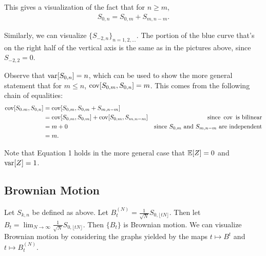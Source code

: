 \documentclass[../../../Master/AppliedStochastics.tex]{subfiles}
\begin{document}
This gives a visualization of the fact that for $n\geq m$, 
$$\begin{aligned}
    S_{0,n}=S_{0,m}+S_{m,n-m}.
\end{aligned}$$

Similarly, we can visualize $\{S_{-2,n}\}_{n=1,2,\dots}$.  
The portion of the blue curve that's on the right half of the vertical axis is the same as in the pictures above, since $S_{-2,2}=0$.

\begin{center}
\end{center}

Observe that $\operatorname{var}[S_{0,n}]=n$, which can be used to show the more general statement that for $m\leq n$, $\operatorname{cov}[S_{0,m},S_{0,n}]=m$.  
This comes from the following chain of equalities:
$$\begin{aligned}
\operatorname{cov}[S_{0.m},S_{0,n}]&=\operatorname{cov}[S_{0,m},S_{0,m}+S_{m,n-m}]\\
    &=\operatorname{cov}[S_{0,m},S_{0,m}]+\operatorname{cov}[S_{0,m},S_{m,n-m}]&\text{since }\operatorname{cov}\text{ is bilinear}\\
    &=m+0&\text{since }S_{0,m}\text{ and }S_{m,n-m}\text{ are independent}\\
    &=m.
\end{aligned}$$

Note that Equation 1 holds in the more general case that $\mathbb{E}[Z]=0$ and $\operatorname{var}[Z]=1$.

\subsection{Brownian Motion}

Let $S_{k,n}$ be defined as above.  
Let $B_t^{(N)}=\frac{1}{\sqrt{N}}S_{0,\lfloor tN\rfloor}$.  
Then let $B_t=\lim_{N\to\infty}\frac{1}{\sqrt{N}}S_{0,\lfloor tN\rfloor}$.  
Then $\{B_t\}$ is Brownian motion.  
We can visualize Brownian motion by considering the graphs yielded by the maps $t\mapsto B^t$ and $t\mapsto B_t^{(N)}$.
\end{document}
